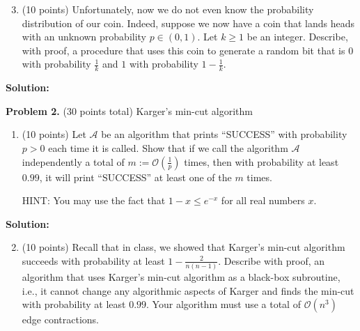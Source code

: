 \documentclass[11pt]{article}
\begin{document}
\begin{enumerate}
\setcounter{enumi}{2}
\item (10 points)
Unfortunately, now we do not even know the probability distribution of our coin. 
Indeed, suppose we now have a coin that lands heads with an unknown probability $p\in(0,1)$. 
Let $k\ge 1$ be an integer. 
Describe, with proof, a procedure that uses this coin to generate a random bit that is $0$ with probability $\frac{1}{k}$ and $1$ with probability $1-\frac{1}{k}$. 
\end{enumerate}

\noindent\textbf{Solution:}






\newpage\noindent
\textbf{Problem 2.} (30 points total)
Karger's min-cut algorithm
\begin{enumerate}
\item (10 points)
Let $\mathcal{A}$ be an algorithm that prints ``SUCCESS'' with probability $p>0$ each time it is called. 
Show that if we call the algorithm $\mathcal{A}$ independently a total of $m:=\mathcal{O}\left(\frac{1}{p}\right)$ times, then with probability at least $0.99$, it will print ``SUCCESS'' at least one of the $m$ times. 

\noindent
HINT: You may use the fact that $1-x\le e^{-x}$ for all real numbers $x$. 
\end{enumerate}

\noindent\textbf{Solution:}











\begin{enumerate}
\setcounter{enumi}{1}
\item (10 points)
Recall that in class, we showed that Karger's min-cut algorithm succeeds with probability at least $1-\frac{2}{n(n-1)}$. 
Describe with proof, an algorithm that uses Karger's min-cut algorithm as a black-box subroutine, i.e., it cannot change any algorithmic aspects of Karger and finds the min-cut with probability at least $0.99$. 
Your algorithm must use a total of $\mathcal{O}(n^3)$ edge contractions. 
\end{enumerate}
\end{document}

